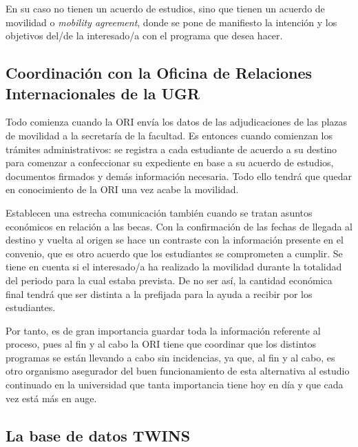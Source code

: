 En su caso no tienen un acuerdo de estudios, sino que tienen un acuerdo de movilidad o \textit{mobility agreement}, donde se pone de manifiesto la intención y los objetivos del/de la interesado/a con el programa que desea hacer.



\subsection{Coordinación con la Oficina de Relaciones Internacionales de la UGR}

Todo comienza cuando la ORI envía los datos de las adjudicaciones de las plazas de movilidad a la secretaría de la facultad. Es entonces cuando comienzan los trámites administrativos: se registra a cada estudiante de acuerdo a su destino para comenzar a confeccionar su expediente en base a su acuerdo de estudios, documentos firmados y demás información necesaria. Todo ello tendrá que quedar en conocimiento de la ORI una vez acabe la movilidad.

Establecen una estrecha comunicación también cuando se tratan asuntos económicos en relación a las becas. Con la confirmación de las fechas de llegada al destino y vuelta al origen se hace un contraste con la información presente en el convenio, que es otro acuerdo que los estudiantes se comprometen a cumplir. Se tiene en cuenta si el interesado/a ha realizado la movilidad durante la totalidad del periodo para la cual estaba prevista. De no ser así, la cantidad económica final tendrá que ser distinta a la prefijada para la ayuda a recibir por los estudiantes.

Por tanto, es de gran importancia guardar toda la información referente al proceso, pues al fin y al cabo la ORI tiene que coordinar que los distintos programas se están llevando a cabo sin incidencias, ya que, al fin y al cabo, es otro organismo asegurador del buen funcionamiento de esta alternativa al estudio continuado en la universidad que tanta importancia tiene hoy en día y que cada vez está más en auge.

\subsection{La base de datos TWINS}



